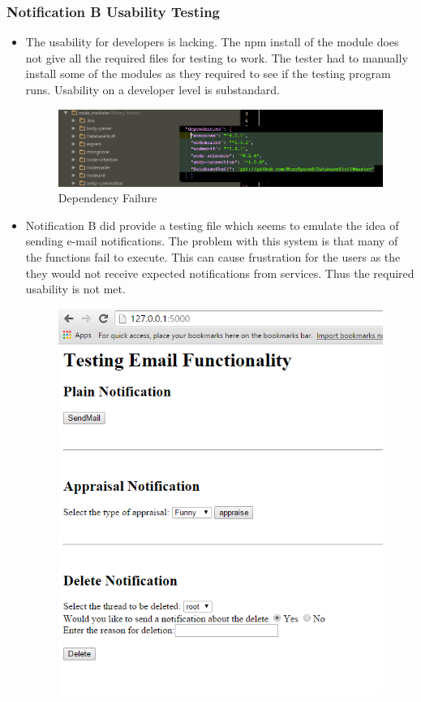 \subsubsection{Notification B Usability Testing}
\begin{itemize}
	\item The usability for developers is lacking. The npm install of the module does not give all the required files for testing to work. The tester had to manually install some of the modules as they required to see if the testing program runs. Usability on a developer level is substandard. 
	\begin{figure}[h!]
		\includegraphics[width=\linewidth]{../images/Dependencies.png}
		\caption{Dependency Failure}
		\label{fig:depFailA}
	\end{figure}
	\item Notification B did provide a testing file which seems to emulate the idea of sending e-mail notifications. The problem with this system is that many of the functions fail to execute. This can cause frustration for the users as the they would not receive expected notifications from services. Thus the required usability is not met.
	\begin{figure}[h!]
		\includegraphics[width=\linewidth]{../images/Interface.png}

\end{figure}
\end{itemize}
